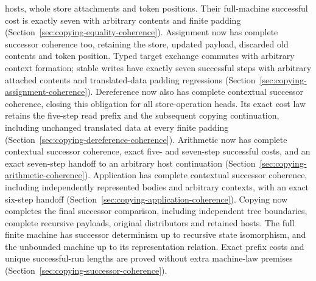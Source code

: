 \begin{enumerate}
hosts, whole store attachments and token positions. Their full-machine
successful cost is exactly seven with arbitrary contents and finite padding
(Section~\ref{sec:copying-equality-coherence}). Assignment now has complete
successor coherence too, retaining the store, updated payload, discarded old
contents and token position. Typed target exchange commutes with arbitrary
context formation; stable writes have exactly seven successful steps with
arbitrary attached contents and translated-data padding regressions
(Section~\ref{sec:copying-assignment-coherence}). Dereference now also has
complete contextual successor coherence, closing this obligation for all
store-operation heads. Its exact cost law retains the five-step read prefix
and the subsequent copying continuation, including unchanged translated data
at every finite padding (Section~\ref{sec:copying-dereference-coherence}).
Arithmetic now has complete contextual successor coherence, exact five- and
seven-step successful costs, and an exact seven-step handoff to an arbitrary
host continuation (Section~\ref{sec:copying-arithmetic-coherence}).
Application has complete contextual successor coherence, including
independently represented bodies and arbitrary contexts, with an exact six-step
handoff (Section~\ref{sec:copying-application-coherence}). Copying now completes
the final successor comparison, including independent tree boundaries, complete
recursive payloads, original distributors and retained hosts. The full finite
machine has successor determinism up to recursive state isomorphism, and the
unbounded machine up to its representation relation. Exact prefix costs and
unique successful-run lengths are proved without extra machine-law premises
(Section~\ref{sec:copying-successor-coherence}).


\end{enumerate}
